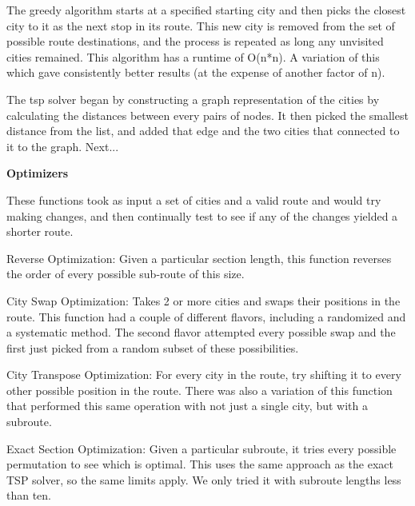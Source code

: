 \documentclass[letterpaper,10pt,titlepage,fleqn]{article}
\begin{document}
The greedy algorithm starts at a specified starting city and then picks the closest city to it as the next stop in its route. This new city is removed from the set of possible route destinations, and the process is repeated as long any unvisited cities remained. This algorithm has a runtime of O(n*n). A variation of this which gave consistently better results (at the expense of another factor of n).

The tsp solver began by constructing a graph representation of the cities by calculating the distances between every pairs of nodes. It then picked the smallest distance from the list, and added that edge and the two cities that connected to it to the graph. Next... \\

\begin{Large}
\textbf{Optimizers} \\
\end{Large}
These functions took as input a set of cities and a valid route and would try making changes, and then continually test to see if any of the changes yielded a shorter route.

Reverse Optimization: Given a particular section length, this function reverses the order of every possible sub-route of this size.

City Swap Optimization: Takes 2 or more cities and swaps their positions in the route. This function had a couple of different flavors, including a randomized and a systematic method. The second flavor attempted every possible swap and the first just picked from a random subset of these possibilities.

City Transpose Optimization: For every city in the route, try shifting it to every other possible position in the route. There was also a variation of this function that performed this same operation with not just a single city, but with a subroute.

Exact Section Optimization: Given a particular subroute, it tries every possible permutation to see which is optimal. This uses the same approach as the exact TSP solver, so the same limits apply. We only tried it with subroute lengths less than ten. \\
\end{document}
